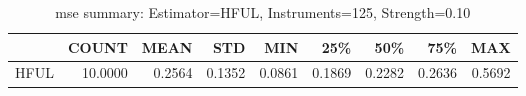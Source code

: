 \begin{table}[ht]
\centering
\caption{mse summary: Estimator=HFUL, Instruments=125, Strength=0.10}
\begin{tabular}{lrrrrrrrr}
\toprule
 & COUNT & MEAN & STD & MIN & 25\% & 50\% & 75\% & MAX \\
\midrule
HFUL & 10.0000 & 0.2564 & 0.1352 & 0.0861 & 0.1869 & 0.2282 & 0.2636 & 0.5692 \\
\bottomrule
\end{tabular}
\end{table}

